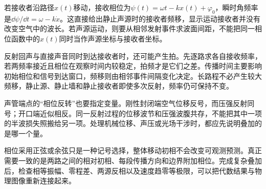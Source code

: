 若接收者沿路径$x(t)$移动，接收相位为$\psi(t)=\omega t-kx(t)+\varphi_0$，瞬时角频率是$\dd\psi/\dd t=\omega-k\dot x$。这直接给出静止声源时的接收者频移，显示运动接收者并没有改变空气中的波长。若声源运动，则要从相邻发射事件求波面间距，不能把同一相位函数中的$x(t)$同时当作声源坐标与接收者坐标。

反射回声与直接声音同时到达接收者时，还可能产生拍。先逐路求各自接收频率，若两频率接近且相位在观察时间内较稳定，拍频才是它们之差。传播时间主要影响初始相位和信号到达窗口，频移则由相邻事件间隔变化决定。长路程不必产生较大频移，静止源、静止墙和静止接收者即使多次反射，频率仍可保持不变。

声管端点的“相位反转”也要指定变量。刚性封闭端空气位移反号，而压强反射同号；开口端近似相反。同一反射过程的位移波节和压强波腹共存，不能把其中一项的半波损失照搬给另一项。处理机械位移、声压或光场干涉时，都应先说明叠加的是哪一个量。

相位采用正弦或余弦只是一种记号选择，整体移动初相不会改变可观测预测。真正需要一致的是两路之间的相对初相、每段传播方向和边界附加相位。完成复杂叠加后，检查相等振幅、零程差、两源反相以及速度趋零等极限，可以把代数结果与物理图像重新连接起来。

